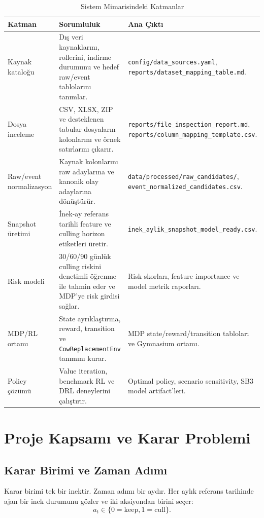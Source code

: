 \documentclass[conference]{IEEEtran}
\begin{document}
\begin{table}[!t]
\caption{Sistem Mimarisindeki Katmanlar}
\label{tab:architecture_layers}
\centering
\begin{tabular}{p{}p{}p{}}
\toprule
Katman & Sorumluluk & Ana Çıktı \\
\midrule
Kaynak kataloğu & Dış veri kaynaklarını, rollerini, indirme durumunu ve hedef
raw/event tablolarını tanımlar. & \texttt{config/data\_sources.yaml},
\texttt{reports/dataset\_mapping\_table.md}. \\
Dosya inceleme & CSV, XLSX, ZIP ve desteklenen tabular dosyaların kolonlarını ve
örnek satırlarını çıkarır. & \texttt{reports/file\_inspection\_report.md},
\texttt{reports/column\_mapping\_template.csv}. \\
Raw/event normalizasyon & Kaynak kolonlarını raw adaylarına ve kanonik olay
adaylarına dönüştürür. & \texttt{data/processed/raw\_candidates/},
\texttt{event\_normalized\_candidates.csv}. \\
Snapshot üretimi & İnek-ay referans tarihli feature ve culling horizon etiketleri
üretir. & \texttt{inek\_aylik\_snapshot\_model\_ready.csv}. \\
Risk modeli & 30/60/90 günlük culling riskini denetimli öğrenme ile tahmin eder
ve MDP'ye risk girdisi sağlar. & Risk skorları, feature importance ve model
metrik raporları. \\
MDP/RL ortamı & State ayrıklaştırma, reward, transition ve \texttt{CowReplacementEnv}
tanımını kurar. & MDP state/reward/transition tabloları ve Gymnasium ortamı. \\
Policy çözümü & Value iteration, benchmark RL ve DRL deneylerini çalıştırır. &
Optimal policy, scenario sensitivity, SB3 model artifact'leri. \\
\bottomrule
\end{tabular}
\end{table}

\section{Proje Kapsamı ve Karar Problemi}
\subsection{Karar Birimi ve Zaman Adımı}
Karar birimi tek bir inektir. Zaman adımı bir aydır. Her aylık referans tarihinde
ajan bir inek durumunu gözler ve iki aksiyondan birini seçer:
\begin{equation}
    a_t \in \{0=\mathrm{keep}, 1=\mathrm{cull}\}.
\end{equation}
\end{document}
